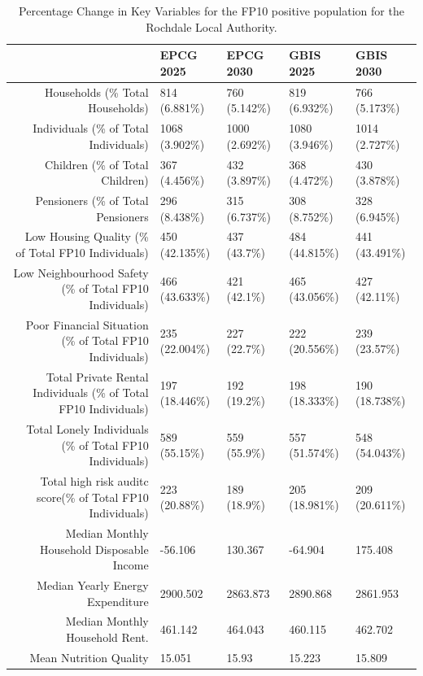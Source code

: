 \begin{table}[ht]
\centering
\begingroup\scriptsize
\begin{tabular}{rllll}
  \hline
 & EPCG 2025 & EPCG 2030 & GBIS 2025 & GBIS 2030 \\ 
  \hline
Households (\% Total Households) & 814 (6.881\%) & 760 (5.142\%) & 819 (6.932\%) & 766 (5.173\%) \\ 
  Individuals (\% of Total Individuals) & 1068 (3.902\%) & 1000 (2.692\%) & 1080 (3.946\%) & 1014 (2.727\%) \\ 
  Children (\% of Total Children) & 367 (4.456\%) & 432 (3.897\%) & 368 (4.472\%) & 430 (3.878\%) \\ 
  Pensioners (\% of Total Pensioners & 296 (8.438\%) & 315 (6.737\%) & 308 (8.752\%) & 328 (6.945\%) \\ 
  Low Housing Quality (\% of Total FP10 Individuals) & 450 (42.135\%) & 437 (43.7\%) & 484 (44.815\%) & 441 (43.491\%) \\ 
  Low Neighbourhood Safety (\% of Total FP10 Individuals) & 466 (43.633\%) & 421 (42.1\%) & 465 (43.056\%) & 427 (42.11\%) \\ 
  Poor Financial Situation (\% of Total FP10 Individuals) & 235 (22.004\%) & 227 (22.7\%) & 222 (20.556\%) & 239 (23.57\%) \\ 
  Total Private Rental Individuals (\% of Total FP10 Individuals) & 197 (18.446\%) & 192 (19.2\%) & 198 (18.333\%) & 190 (18.738\%) \\ 
  Total Lonely Individuals (\% of Total FP10 Individuals) & 589 (55.15\%) & 559 (55.9\%) & 557 (51.574\%) & 548 (54.043\%) \\ 
  Total high risk auditc score(\% of Total FP10 Individuals) & 223 (20.88\%) & 189 (18.9\%) & 205 (18.981\%) & 209 (20.611\%) \\ 
  Median Monthly Household Disposable Income & -56.106 & 130.367 & -64.904 & 175.408 \\ 
  Median Yearly Energy Expenditure & 2900.502 & 2863.873 & 2890.868 & 2861.953 \\ 
  Median Monthly Household Rent. & 461.142 & 464.043 & 460.115 & 462.702 \\ 
  Mean Nutrition Quality & 15.051 & 15.93 & 15.223 & 15.809 \\ 
   \hline
\end{tabular}
\endgroup
\caption{Percentage Change in Key Variables for the FP10 positive population for the Rochdale Local Authority.} 
\label{tab: rochdale_circumstances_table}
\end{table}
